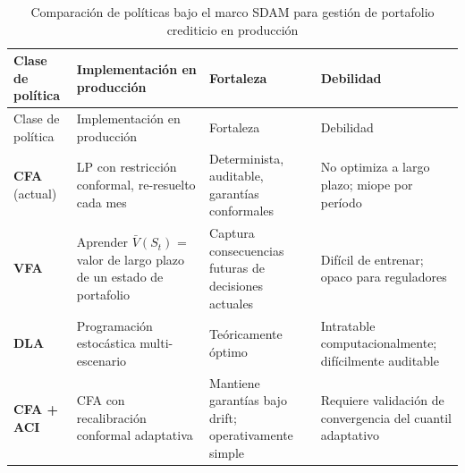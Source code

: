 \documentclass[
  spanish,
  11pt,
  letterpaper,
]{scrbook}
\theoremstyle{plain}
\theoremstyle{remark}
\begin{document}
\begin{longtable}[]{@{}
  >{\raggedright\arraybackslash}p{}
  >{\raggedright\arraybackslash}p{}
  >{\raggedright\arraybackslash}p{}
  >{\raggedright\arraybackslash}p{}@{}}
\caption{Comparación de políticas bajo el marco SDAM para gestión de
portafolio crediticio en
producción}\label{tbl-sdam-production-policies}\tabularnewline
\toprule\noalign{}
\begin{minipage}[b]{\linewidth}\raggedright
Clase de política
\end{minipage} & \begin{minipage}[b]{\linewidth}\raggedright
Implementación en producción
\end{minipage} & \begin{minipage}[b]{\linewidth}\raggedright
Fortaleza
\end{minipage} & \begin{minipage}[b]{\linewidth}\raggedright
Debilidad
\end{minipage} \\
\midrule\noalign{}
\endfirsthead
\toprule\noalign{}
\begin{minipage}[b]{\linewidth}\raggedright
Clase de política
\end{minipage} & \begin{minipage}[b]{\linewidth}\raggedright
Implementación en producción
\end{minipage} & \begin{minipage}[b]{\linewidth}\raggedright
Fortaleza
\end{minipage} & \begin{minipage}[b]{\linewidth}\raggedright
Debilidad
\end{minipage} \\
\midrule\noalign{}
\endhead
\bottomrule\noalign{}
\endlastfoot
\textbf{CFA} (actual) & LP con restricción conformal, re-resuelto cada
mes & Determinista, auditable, garantías conformales & No optimiza a
largo plazo; miope por período \\
\textbf{VFA} & Aprender \(\bar{V}(S_t)\) = valor de largo plazo de un
estado de portafolio & Captura consecuencias futuras de decisiones
actuales & Difícil de entrenar; opaco para reguladores \\
\textbf{DLA} & Programación estocástica multi-escenario & Teóricamente
óptimo & Intratable computacionalmente; difícilmente auditable \\
\textbf{CFA + ACI} & CFA con recalibración conformal adaptativa &
Mantiene garantías bajo drift; operativamente simple & Requiere
validación de convergencia del cuantil adaptativo \\
\end{longtable}
\end{document}
